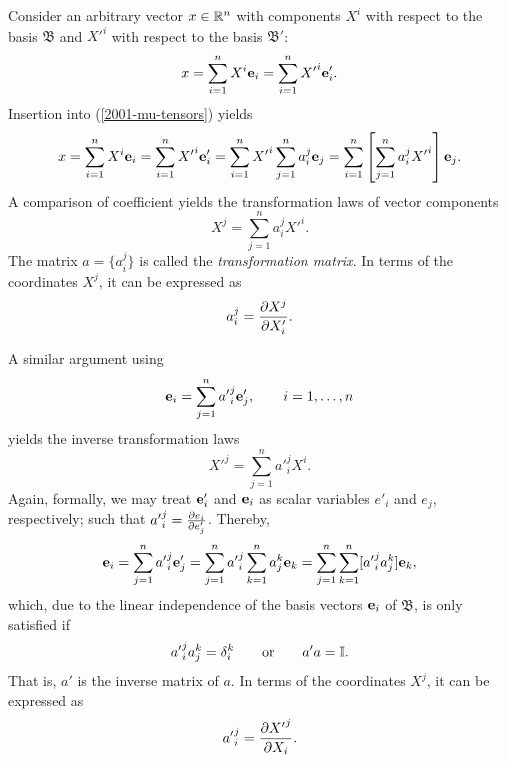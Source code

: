 Consider an arbitrary vector $x\in {\Bbb R}^n$
with components $X^i$ with respect to the basis
${\mathfrak B}$
and   ${X'}^i$  with respect to the basis
${\mathfrak B'}$:
\begin{equation}
x
=\sum_{i=1}^n X^i {\bf e}_i
=\sum_{i=1}^n {X'}^i {\bf e}'_i
.
\end{equation}
Insertion into (\ref{2001-mu-tensors}) yields
\begin{equation}
x
=\sum_{i=1}^n X^i {\bf e}_i
=\sum_{i=1}^n {X'}^i {\bf e}'_i
=\sum_{i=1}^n {X'}^i \sum_{j=1}^n a_i^j {\bf e}_j=
\sum_{i=1}^n\left[\sum_{j=1}^n a_i^j{X'}^i \right] {\bf e}_j.
\end{equation}
A comparison of coefficient yields the transformation laws of vector components
\begin{equation}
X^j   = \sum_{j=1}^n a_i^j{X'}^i.
\end{equation}
The matrix $a=\{a_i^j\}$ is called the {\em transformation matrix}.
In terms of the coordinates $X^j$, it can be expressed as
\begin{equation}
a_i^j ={\partial X^j \over \partial X'_i}  .
\label{2001-mu-tensor-tl1}
\end{equation}


A similar argument using
\begin{equation}
{\bf e}_i=\sum_{j=1}^n {a'}_i^j {\bf e}'_j, \qquad i=1,\ldots , n
\end{equation}
yields the inverse transformation laws
\begin{equation}
{X'}^j   = \sum_{j=1}^n {a'}_i^j{X}^i.
\end{equation}
Again, formally, we may treat  ${\bf e}'_i$ and ${\bf e}_i$
as scalar variables $e'_i$ and $e_j$, respectively; such that
${a'}_i^j ={\partial {e}_i \over \partial { e}'_j}$.
Thereby,
\begin{equation}
{\bf e}_i=\sum_{j=1}^n {a'}_i^j {\bf e}'_j
=\sum_{j=1}^n {a'}_i^j \sum_{k=1}^n a_j^k {\bf e}_k
=\sum_{j=1}^n \sum_{k=1}^n [{a'}_i^j a_j^k] {\bf e}_k,
\end{equation}
which, due to the linear independence of the basis vectors ${\bf e}_i$ of ${\mathfrak B}$,
is only satisfied if
\begin{equation}
{a'}_i^j a_j^k =\delta_i^k
\qquad
{\rm or}
\qquad
a'a={\Bbb I}.
\end{equation}
That is, $a'$ is the inverse matrix of $a$.
In terms of the coordinates $X^j$, it can be expressed as
\begin{equation}
{a'}_i^j ={\partial {X'}^j \over \partial X_i}  .
\label{2001-mu-tensor-tl2}
\end{equation}

